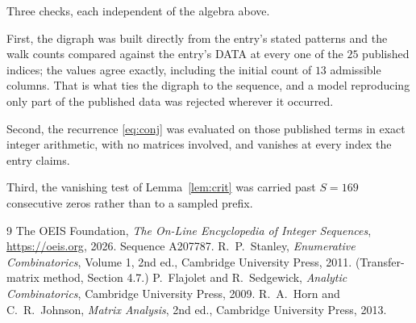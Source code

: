 \documentclass[11pt,a4paper]{article}
\theoremstyle{plain}
\theoremstyle{definition}
\begin{document}
Three checks, each independent of the algebra above.

First, the digraph was built directly from the entry's stated patterns and the walk counts
compared against the entry's DATA at every one of the $25$ published indices; the
values agree exactly, including the initial count of $13$ admissible columns. That is
what ties the digraph to the sequence, and a model reproducing only part of the published
data was rejected wherever it occurred.

Second, the recurrence \eqref{eq:conj} was evaluated on those published terms in exact
integer arithmetic, with no matrices involved, and vanishes at every index the entry claims.

Third, the vanishing test of Lemma~\ref{lem:crit} was carried past $S=169$ consecutive
zeros rather than to a sampled prefix.

\begin{thebibliography}{9}
 The OEIS Foundation, \emph{The On-Line Encyclopedia of Integer
Sequences}, \url{https://oeis.org}, 2026. Sequence A207787.
 R.~P.~Stanley, \emph{Enumerative Combinatorics}, Volume 1, 2nd ed.,
Cambridge University Press, 2011. (Transfer-matrix method, Section 4.7.)
 P.~Flajolet and R.~Sedgewick, \emph{Analytic Combinatorics}, Cambridge
University Press, 2009.
 R.~A.~Horn and C.~R.~Johnson, \emph{Matrix Analysis}, 2nd ed., Cambridge
University Press, 2013.
\end{thebibliography}
\end{document}
